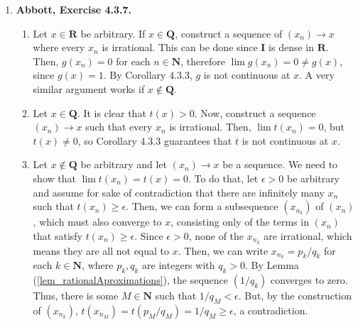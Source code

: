 \documentclass{article}
\makeatletter
\DeclarePairedDelimiter\floor{\lfloor}{\rfloor}
\let\oldfloor\floor
\def\floor{\@ifstar{\oldfloor}{\oldfloor*}}
\newcommand{\N}{\mathbf{N}}
\newcommand{\Q}{\mathbf{Q}}
\newcommand{\I}{\mathbf{I}}
\newcommand{\R}{\mathbf{R}}
\newcommand{\exc}[2][Abbott]{\item \textbf{#1, Exercise #2.}}
\newcommand{\lep}[1][L]{#1et $\epsilon > 0$ be arbitrary}
\makeatother
\begin{document}
\begin{enumerate}
\begin{enumerate}
        \item $f(x) = 0$ and $g(x)= \floor{x}$.
        
        \item \begin{equation*}
            f(x) = \begin{cases}
            2 & x = 0 \\ 
            \frac{1}{2} & x \neq 0.
            \end{cases}
        \end{equation*}
        
        \item Not possible. Assume $f(x)^3$ is continuous at $0$. We've shown in Exercise $4.3.1$ that $g(x)=\sqrt[3]{x}$ is continuous at $0$, so Theorem 4.3.9 guarantees that $g(f(x)^3) = f(x)$ is continuous at $0$. The contrapositive of we just proved is that if $f$ is not continuous at $0$, then $f(x)^3$ is also not continuous at $0$.
    \end{enumerate}
    
    \exc{4.3.7}
    \begin{enumerate}
        \item Let $x \in \R$ be arbitrary. If $x \in \Q$, construct a sequence of $(x_n) \to x$ where every $x_n$ is irrational. This can be done since $\I$ is dense in $\R$. Then, $g(x_n) = 0$ for each $n \in \N$, therefore $\lim g(x_n) = 0 \neq g(x)$, since $g(x) = 1$. By Corollary 4.3.3, $g$ is not continuous at $x$. A very similar argument works if $x \notin \Q$.
        
        \item Let $x \in \Q$. It is clear that $t(x) > 0$. Now, construct a sequence $(x_n) \to x$ such that every $x_n$ is irrational. Then, $\lim t(x_n) = 0$, but $t(x) \neq 0$, so Corollary 4.3.3 guarantees that $t$ is not continuous at $x$.
        
        \item Let $x \notin \Q$ be arbitrary and let $(x_n) \to x$ be a sequence. We need to show that $\lim t(x_n) = t(x) = 0$. To do that, \lep[l] \space and assume for sake of contradiction that there are infinitely many $x_n$ such that $t(x_n) \geq \epsilon$. Then, we can form a subsequence $(x_{n_k})$ of $(x_n)$, which must also converge to $x$, consisting only of the terms in $(x_n)$ that satisfy $t(x_n) \geq \epsilon$. Since $\epsilon > 0$, none of the $x_{n_k}$ are irrational, which means they are all not equal to $x$. Then, we can write $x_{n_k} = p_k/q_k$ for each $k \in \N$, where $p_k, q_k$ are integers with $q_k > 0$. By Lemma (\ref{lem_rationalAproximations}), the sequence $(1/q_k)$ converges to zero. Thus, there is some $M \in \N$ such that $1/q_M < \epsilon$. But, by the construction of $(x_{n_k})$, $t(x_{n_M}) = t(p_M/q_M) = 1/q_M \geq \epsilon$, a contradiction.
        

\end{enumerate}
\end{enumerate}
\end{document}
